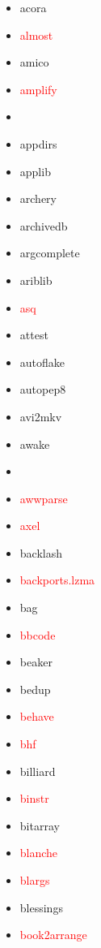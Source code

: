 \documentclass{l4proj}
\begin{document}
\begin{appendices}
\noindent\parbox[t]{0.32\textwidth}{\raggedright%
\begin{itemize}
\item acora
\item\textcolor{red}{almost}
\item amico
\item\textcolor{red}{amplify}
\item {}
\item appdirs
\item applib
\item archery
\item archivedb
\item argcomplete
\item ariblib
\item\textcolor{red}{asq}
\item attest
\item autoflake
\item autopep8
\item avi2mkv
\item awake
\end{itemize}
}%
\noindent\parbox[t]{0.32\textwidth}{\raggedright%
\begin{itemize}
\item\textcolor{red}{}
\item\textcolor{red}{awwparse}
\item\textcolor{red}{axel}
\item backlash
\item\textcolor{red}{backports.lzma}
\item bag
\item\textcolor{red}{bbcode}
\item beaker
\item bedup
\item\textcolor{red}{behave}
\item\textcolor{red}{bhf}
\item billiard
\item\textcolor{red}{binstr}
\item bitarray
\item\textcolor{red}{blanche}
\item\textcolor{red}{blargs}
\item blessings
\end{itemize}
}%
\noindent\parbox[t]{0.32\textwidth}{\raggedright%
\begin{itemize}
\item\textcolor{red}{book2arrange}

\end{itemize}}
\end{appendices}
\end{document}
